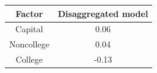 \begin{table}[!ht]
\setlength\tabcolsep{0.425em}
\setlength\aboverulesep{0pt}
\setlength\belowrulesep{0.2em}
\centering
\begin{threeparttable}
\begin{tabular}{cc}
\toprule[0.1em]
Factor & Disaggregated model \\[0.2em]
\midrule[0.075em]
Capital & 0.06 \\[0.2em]
Noncollege & 0.04 \\[0.2em]
College & -0.13 \\[0.2em]
\bottomrule[0.1em]
\end{tabular}
\end{threeparttable}
\end{table}

